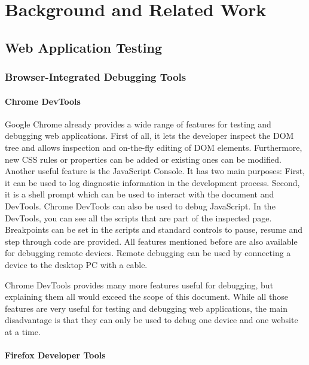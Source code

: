\chapter{Background and Related Work}

\section{Web Application Testing}

\subsection{Browser-Integrated Debugging Tools}

\subsubsection{Chrome DevTools}

Google Chrome already provides a wide range of features for testing and debugging web applications. First of all, it lets the developer inspect the DOM tree  and allows inspection and on-the-fly editing of DOM elements. Furthermore, new CSS rules or properties can be added or existing ones can be modified. Another useful feature is the JavaScript Console. It has two main purposes: First, it can be used to log diagnostic information in the development process. Second, it is a shell prompt which can be used to interact with the document and DevTools. Chrome DevTools can also be used to debug JavaScript. In the DevTools, you can see all the scripts that are part of the inspected page. Breakpoints can be set in the scripts and standard controls to pause, resume and step through code are provided. All features mentioned before are also available for debugging remote devices. Remote debugging can be used by connecting a device to the desktop PC with a cable.

Chrome DevTools provides many more features useful for debugging, but explaining them all would exceed the scope of this document. While all those features are very useful for testing and debugging web applications, the main disadvantage is that they can only be used to debug one device and one website at a time.

\subsubsection{Firefox Developer Tools}

